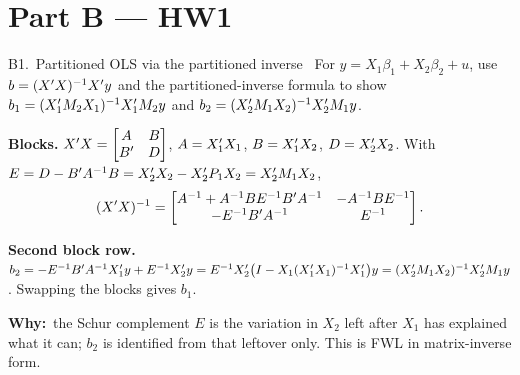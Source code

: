 \documentclass[11pt]{article}
\newcommand{\tagbox}[2]{\tcbox[on line, colback=#1, colframe=#1, coltext=white,
  boxsep=1pt, left=3pt, right=3pt, top=0pt, bottom=0pt, arc=1.5pt]{\scriptsize\sffamily\bfseries #2}}
\newcommand{\likely}{\tagbox{likelyor}{$\star\star$ LIKELY}}
\newcommand{\hwtag}[1]{\tagbox{hwblue}{HW1 #1}}
\newcommand{\step}[1]{\par\smallskip\noindent\textbf{\textcolor{qnavy}{#1}}\quad\ignorespaces}
\newcommand{\Why}{\textbf{\textcolor{whyline}{Why:}}\ }
\begin{document}
\section{Part B --- HW1}

\begin{qbox}{B1.\ Partitioned OLS via the partitioned inverse}{\likely\ \hwtag{Q1}}
For $y = X_{1}\beta_{1} + X_{2}\beta_{2} + u$, use $b = (X^{\prime} X)^{-1}X^{\prime} y$ and the partitioned-inverse
formula to show $b_{1} = (X_{1}^{\prime} M_{2}X_{1})^{-1}X_{1}^{\prime} M_{2}y$ and
$b_{2} = (X_{2}^{\prime} M_{1}X_{2})^{-1}X_{2}^{\prime} M_{1}y$.
\end{qbox}
\begin{solbox}
\step{Blocks.} $X^{\prime} X = \begin{bmatrix}A&B\\B^{\prime}&D\end{bmatrix}$, $A=X_{1}^{\prime} X_{1}$, $B=X_{1}^{\prime} X_{2}$, $D=X_{2}^{\prime} X_{2}$.
With $E = D - B^{\prime} A^{-1}B = X_{2}^{\prime} X_{2} - X_{2}^{\prime} P_{1}X_{2} = X_{2}^{\prime} M_{1}X_{2}$,
\[
  (X^{\prime} X)^{-1} = \begin{bmatrix}A^{-1}+A^{-1}BE^{-1}B^{\prime} A^{-1} & -A^{-1}BE^{-1}\\ -E^{-1}B^{\prime} A^{-1} & E^{-1}\end{bmatrix}.
\]
\step{Second block row.}
$b_{2} = -E^{-1}B^{\prime} A^{-1}X_{1}^{\prime} y + E^{-1}X_{2}^{\prime} y = E^{-1}X_{2}^{\prime}\big(I-X_{1}(X_{1}^{\prime} X_{1})^{-1}X_{1}^{\prime}\big)y = (X_{2}^{\prime} M_{1}X_{2})^{-1}X_{2}^{\prime} M_{1}y$.
Swapping the blocks gives $b_{1}$.
\begin{why}\Why the Schur complement $E$ is the variation in $X_{2}$ left after $X_{1}$ has explained what it can;
$b_{2}$ is identified from that leftover only. This is FWL in matrix-inverse form.\end{why}
\end{solbox}
\end{document}
